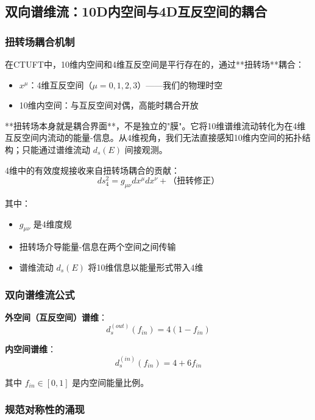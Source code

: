 \subsection{双向谱维流：10D内空间与4D互反空间的耦合}

\subsubsection{扭转场耦合机制}

在CTUFT中，10维内空间和4维互反空间是平行存在的，通过**扭转场**耦合：
\begin{itemize}
    \item $x^\mu$：4维互反空间（$\mu = 0,1,2,3$）——我们的物理时空
    \item 10维内空间：与互反空间对偶，高能时耦合开放
\end{itemize}

**扭转场本身就是耦合界面**，不是独立的"膜"。它将10维谱维流动转化为在4维互反空间内流动的能量-信息。从4维视角，我们无法直接感知10维内空间的拓扑结构；只能通过谱维流动 $d_s(E)$ 间接观测。

4维中的有效度规接收来自扭转场耦合的贡献：
\begin{equation}
    ds_{4}^2 = g_{\mu\nu}dx^\mu dx^\nu + \text{（扭转修正）}
\end{equation}

其中：
\begin{itemize}
    \item $g_{\mu\nu}$ 是4维度规
    \item 扭转场介导能量-信息在两个空间之间传输
    \item 谱维流动 $d_s(E)$ 将10维信息以能量形式带入4维
\end{itemize}

\subsubsection{双向谱维流公式}

\textbf{外空间（互反空间）谱维}：
\begin{equation}
    d_s^{(out)}(f_{in}) = 4(1 - f_{in})
\end{equation}

\textbf{内空间谱维}：
\begin{equation}
    d_s^{(in)}(f_{in}) = 4 + 6f_{in}
\end{equation}

其中 $f_{in} \in [0,1]$ 是内空间能量比例。

\subsubsection{规范对称性的涌现}

